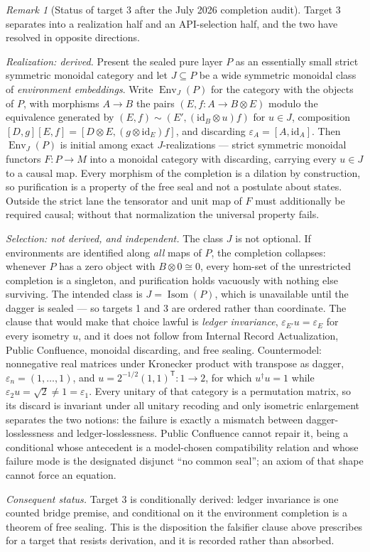 \documentclass[11pt]{article}
\theoremstyle{plain}
\theoremstyle{definition}
\theoremstyle{remark}
\newtheorem{remark}[theorem]{Remark}
\begin{document}
\begin{remark}[Status of target 3 after the July 2026 completion audit]
Target 3 separates into a realization half and an API-selection half, and the two have resolved in opposite directions.

\emph{Realization: derived.} Present the sealed pure layer \(P\) as an essentially small strict symmetric monoidal category and let \(J\subseteq P\) be a wide symmetric monoidal class of \emph{environment embeddings}. Write \(\operatorname{Env}_J(P)\) for the category with the objects of \(P\), with morphisms \(A\to B\) the pairs \((E,f:A\to B\otimes E)\) modulo the equivalence generated by \((E,f)\sim(E',(\mathrm{id}_B\otimes u)f)\) for \(u\in J\), composition \([D,g][E,f]=[D\otimes E,(g\otimes\mathrm{id}_E)f]\), and discarding \(\varepsilon_A=[A,\mathrm{id}_A]\). Then \(\operatorname{Env}_J(P)\) is initial among exact \(J\)-realizations --- strict symmetric monoidal functors \(F:P\to M\) into a monoidal category with discarding, carrying every \(u\in J\) to a causal map. Every morphism of the completion is a dilation by construction, so purification is a property of the free seal and not a postulate about states. Outside the strict lane the tensorator and unit map of \(F\) must additionally be required causal; without that normalization the universal property fails.

\emph{Selection: not derived, and independent.} The class \(J\) is not optional. If environments are identified along \emph{all} maps of \(P\), the completion collapses: whenever \(P\) has a zero object with \(B\otimes0\cong0\), every hom-set of the unrestricted completion is a singleton, and purification holds vacuously with nothing else surviving. The intended class is \(J=\operatorname{Isom}(P)\), which is unavailable until the dagger is sealed --- so targets 1 and 3 are ordered rather than coordinate. The clause that would make that choice lawful is \emph{ledger invariance}, \(\varepsilon_{E'}u=\varepsilon_E\) for every isometry \(u\), and it does not follow from Internal Record Actualization, Public Confluence, monoidal discarding, and free sealing. Countermodel: nonnegative real matrices under Kronecker product with transpose as dagger, \(\varepsilon_n=(1,\dots,1)\), and \(u=2^{-1/2}(1,1)^{\mathsf T}:1\to2\), for which \(u^\dagger u=1\) while \(\varepsilon_2u=\sqrt2\ne1=\varepsilon_1\). Every unitary of that category is a permutation matrix, so its discard is invariant under all unitary recoding and only isometric enlargement separates the two notions: the failure is exactly a mismatch between dagger-losslessness and ledger-losslessness. Public Confluence cannot repair it, being a conditional whose antecedent is a model-chosen compatibility relation and whose failure mode is the designated disjunct ``no common seal''; an axiom of that shape cannot force an equation.

\emph{Consequent status.} Target 3 is conditionally derived: ledger invariance is one counted bridge premise, and conditional on it the environment completion is a theorem of free sealing. This is the disposition the falsifier clause above prescribes for a target that resists derivation, and it is recorded rather than absorbed.
\end{remark}
\end{document}
